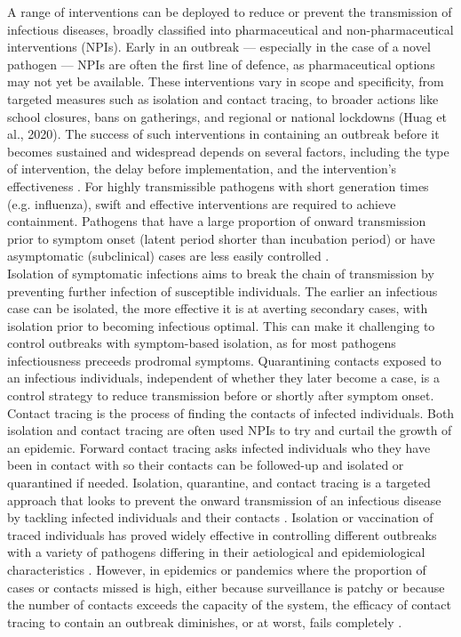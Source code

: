 \documentclass{article}
\begin{document}
A range of interventions can be deployed to reduce or prevent the transmission of infectious diseases, broadly classified into pharmaceutical and non-pharmaceutical interventions (NPIs). Early in an outbreak --- especially in the case of a novel pathogen --- NPIs are often the first line of defence, as pharmaceutical options may not yet be available. These interventions vary in scope and specificity, from targeted measures such as isolation and contact tracing, to broader actions like school closures, bans on gatherings, and regional or national lockdowns (Huag et al., 2020). The success of such interventions in containing an outbreak before it becomes sustained and widespread depends on several factors, including the type of intervention, the delay before implementation, and the intervention’s effectiveness \citep{longiniContainingPandemicInfluenza2005}. For highly transmissible pathogens with short generation times (e.g. influenza), swift and effective interventions are required to achieve containment. Pathogens that have a large proportion of onward transmission prior to symptom onset (latent period shorter than incubation period) or have asymptomatic (subclinical) cases are less easily controlled \citep{fraserFactorsThatMake2004}. \\

Isolation of symptomatic infections aims to break the chain of transmission by preventing further infection of susceptible individuals. The earlier an infectious case can be isolated, the more effective it is at averting secondary cases, with isolation prior to becoming infectious optimal. This can make it challenging to control outbreaks with symptom-based isolation, as for most pathogens infectiousness preceeds prodromal symptoms. Quarantining contacts exposed to an infectious individuals, independent of whether they later become a case, is a control strategy to reduce transmission before or shortly after symptom onset. Contact tracing is the process of finding the contacts of infected individuals. Both isolation and contact tracing are often used NPIs to try and curtail the growth of an epidemic. Forward contact tracing asks infected individuals who they have been in contact with so their contacts can be followed-up and isolated or quarantined if needed. Isolation, quarantine, and contact tracing is a targeted approach that looks to prevent the onward transmission of an infectious disease by tackling infected individuals and their contacts \citep{ferrettiQuantifyingSARSCoV2Transmission2020, keelingEfficacyContactTracing2020}. Isolation or vaccination of traced individuals has proved widely effective in controlling different outbreaks with a variety of pathogens differing in their aetiological and epidemiological characteristics \citep{foegeSELECTIVEEPIDEMIOLOGICCONTROL1971, bellPublicHealthInterventions2004}. However, in epidemics or pandemics where the proportion of cases or contacts missed is high, either because surveillance is patchy or because the number of contacts exceeds the capacity of the system, the efficacy of contact tracing to contain an outbreak diminishes, or at worst, fails completely \citep{dhillonWhenContactTracing2018, hellewellFeasibilityControllingCOVID192020}. \\
\end{document}

